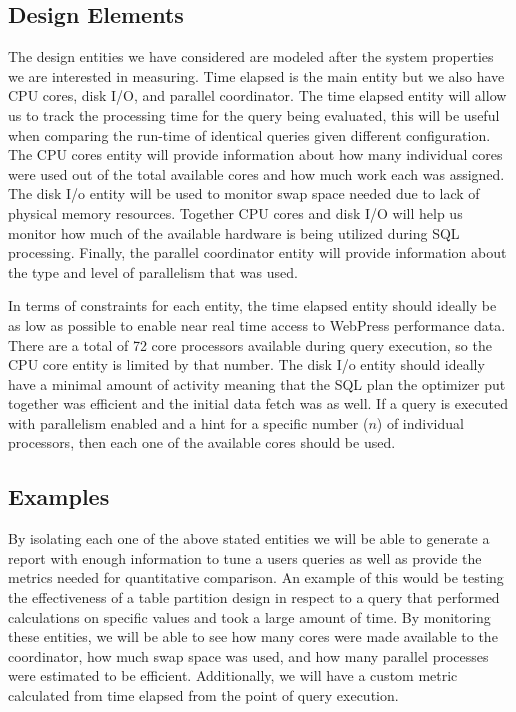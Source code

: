 \documentclass[draftclsnofoot, onecolumn, compsoc, 10pt]{IEEEtran}
\begin{document}
\subsection{Design Elements}
The design entities we have considered are modeled after the system properties we are interested in measuring.
Time elapsed is the main entity but we also have CPU cores, disk I/O, and parallel coordinator.
The time elapsed entity will allow us to track the processing time for the query being evaluated, this will be useful when comparing the run-time of identical queries given different configuration.
The CPU cores entity will provide information about how many individual cores were used out of the total available cores and how much work each was assigned.
The disk I/o entity will be used to monitor swap space needed due to lack of physical memory resources.
Together CPU cores and disk I/O will help us monitor how much of the available hardware is being utilized during SQL processing.
Finally, the parallel coordinator entity will provide information about the type and level of parallelism that was used.

In terms of constraints for each entity, the time elapsed entity should ideally be as low as possible to enable near real time access to WebPress performance data.
There are a total of 72 core processors available during query execution, so the CPU core entity is limited by that number.
The disk I/o entity should ideally have a minimal amount of activity meaning that the SQL plan the optimizer put together was efficient and the initial data fetch was as well.
If a query is executed with parallelism enabled and a hint for a specific number ($n$) of individual processors, then each one of the available cores should be used.

\subsection{Examples}
By isolating each one of the above stated entities we will be able to generate a report with enough information to tune a users queries as well as provide the metrics needed for quantitative comparison.
An example of this would be testing the effectiveness of a table partition design in respect to a query that performed calculations on specific values and took a large amount of time.
By monitoring these entities, we will be able to see how many cores were made available to the coordinator, how much swap space was used, and how many parallel processes were estimated to be efficient.
Additionally, we will have a custom metric calculated from time elapsed from the point of query execution.
\end{document}
